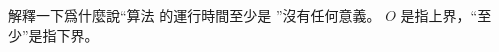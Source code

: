 \startEXERCISE
解釋一下爲什麼說“算法  的運行時間至少是 ”沒有任何意義。
\stopEXERCISE
\startANSWER
$O$ 是指上界，“至少”是指下界。
\stopANSWER
